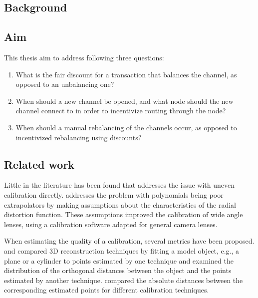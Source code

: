 \subsection{Background}
    \label{sec:background}


\subsection{Aim}
    \label{sec:aim}

This thesis aim to address following three questions:

    \begin{enumerate}
	\item What is the fair discount for a transaction that balances the channel, as
		opposed to an unbalancing one?
	\item When should a new channel be opened, and what node should the new
		channel connect to in order to incentivize routing through the node?
	\item When should a manual rebalancing of the channels occur, as opposed to
		incentivized rebalancing using discounts?
    \end{enumerate}

\subsection{Related work}
    \label{sec:related_work}

    Little in the literature has been found that addresses the issue
    with uneven calibration directly.
    \citet{jung_lee_yoon_inverse_mapping} addresses the problem with
    polynomials being poor extrapolators by making assumptions 
    about the characteristics of the radial distortion function.
    These assumptions improved the calibration of wide angle lenses,
    using a calibration software adapted for general camera lenses.

    When estimating the quality of a calibration,
    several metrics have been proposed.
    \citet{Rabbani2007:Integrated} and 
    \citet{Grussenmeyer2008:Comparison}
    compared 3D reconstruction techniques by fitting a model object,
    e.g., a plane or a cylinder to points estimated by one technique and
    examined the distribution of the orthogonal distances between the object and 
    the points estimated by another technique.
    \citet{Boehler2003:Investigating} compared the absolute distances between 
    the corresponding estimated points for different calibration techniques.

